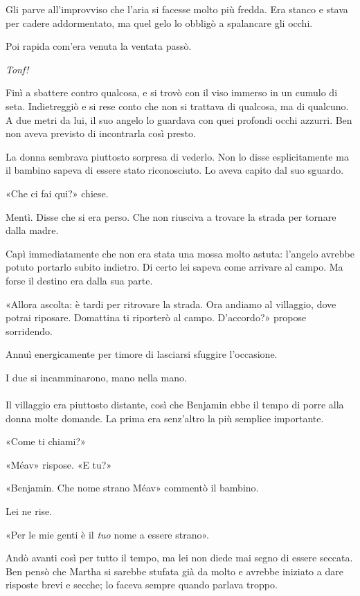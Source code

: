 \documentclass[a4paper,12pt]{book}
\begin{document}
Gli parve all'improvviso che l'aria si facesse molto più fredda. Era stanco e
stava per cadere addormentato, ma quel gelo lo obbligò a spalancare gli occhi.

Poi rapida com'era venuta la ventata passò.

\emph{Tonf!}

Finì a sbattere contro qualcosa, e si trovò con il viso immerso in un cumulo
di seta. Indietreggiò e si rese conto che non si trattava di qualcosa, ma di
qualcuno. A due metri da lui, il suo angelo lo guardava con quei profondi occhi
azzurri. Ben non aveva previsto di incontrarla così presto.

La donna sembrava piuttosto sorpresa di vederlo. Non lo disse esplicitamente ma
il bambino sapeva di essere stato riconosciuto. Lo aveva capito dal suo sguardo.

«Che ci fai qui?» chiese.

Mentì. Disse che si era perso. Che non riusciva a trovare la strada per tornare
dalla madre.

Capì immediatamente che non era stata una mossa molto astuta: l'angelo avrebbe
potuto portarlo subito indietro. Di certo lei sapeva come arrivare al campo. Ma
forse il destino era dalla sua parte.

«Allora ascolta: è tardi per ritrovare la strada. Ora andiamo al villaggio,
dove potrai riposare. Domattina ti riporterò al campo. D'accordo?» propose
sorridendo.

Annuì energicamente per timore di lasciarsi sfuggire l'occasione.

I due si incamminarono, mano nella mano.

\paragraph{}
Il villaggio era piuttosto distante, così che Benjamin ebbe il tempo di porre
alla donna molte domande. La prima era senz'altro la più semplice importante.

«Come ti chiami?»

«Méav» rispose. «E tu?»

«Benjamin. Che nome strano Méav» commentò il bambino.

Lei ne rise.

«Per le mie genti è il \emph{tuo} nome a essere strano».

Andò avanti così per tutto il tempo, ma lei non diede mai segno di essere
seccata. Ben pensò che Martha si sarebbe stufata già da molto e avrebbe
iniziato a dare risposte brevi e secche; lo faceva sempre quando parlava troppo.
\end{document}
